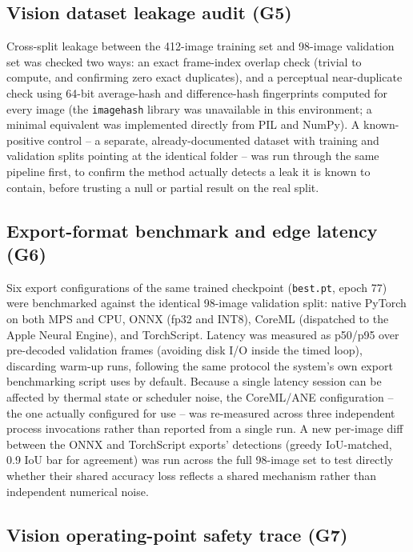 \subsection{Vision dataset leakage audit (G5)}

Cross-split leakage between the 412-image training set and 98-image validation set was checked two
ways: an exact frame-index overlap check (trivial to compute, and confirming zero exact
duplicates), and a perceptual near-duplicate check using 64-bit average-hash and difference-hash
fingerprints computed for every image (the \texttt{imagehash} library was unavailable in this
environment; a minimal equivalent was implemented directly from PIL and NumPy). A known-positive
control -- a separate, already-documented dataset with training and validation splits pointing at
the identical folder -- was run through the same pipeline first, to confirm the method actually
detects a leak it is known to contain, before trusting a null or partial result on the real split.

\subsection{Export-format benchmark and edge latency (G6)}

Six export configurations of the same trained checkpoint (\texttt{best.pt}, epoch 77) were
benchmarked against the identical 98-image validation split: native PyTorch on both MPS and CPU,
ONNX (fp32 and INT8), CoreML (dispatched to the Apple Neural Engine), and TorchScript. Latency was
measured as p50/p95 over pre-decoded validation frames (avoiding disk I/O inside the timed loop),
discarding warm-up runs, following the same protocol the system's own export benchmarking script
uses by default. Because a single latency session can be affected by thermal state or scheduler
noise, the CoreML/ANE configuration -- the one actually configured for use -- was re-measured across three
independent process invocations rather than reported from a single run. A new per-image diff
between the ONNX and TorchScript exports' detections (greedy IoU-matched, 0.9 IoU bar for
agreement) was run across the full 98-image set to test directly whether their shared accuracy loss
reflects a shared mechanism rather than independent numerical noise.

\subsection{Vision operating-point safety trace (G7)}


